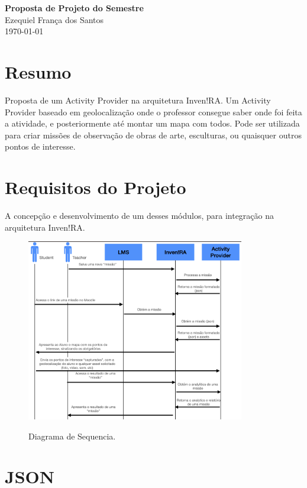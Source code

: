 \documentclass[12pt,a4paper, brazil]{article}
\begin{document}
\begin{center}
{\textbf {\huge Proposta de Projeto do Semestre}}\\[5mm]
{\large Ezequiel França dos Santos} \\[5mm]
\today\\[5mm] %
\end{center}


\section{Resumo}

Proposta de um Activity Provider na arquitetura Inven!RA. Um Activity Provider baseado em geolocalização onde o professor consegue saber onde foi feita a atividade, e posteriormente até montar um mapa com todos. Pode ser utilizada para criar missões de observação de obras de arte, esculturas, ou quaisquer outros pontos de interesse.

\section{Requisitos do Projeto}

A concepção e desenvolvimento de um desses módulos, para integração na arquitetura Inven!RA.\cite{https://doi.org/10.34627/rcc.v16i0.268}


\begin{figure}[ht]
    \centering
    \caption{Diagrama de Sequencia.}
    \includegraphics[width=0.85\textwidth]{diagrama_sequencia.png}
    \label{fig:exemplo}
\end{figure}

\section{JSON}
\end{document}
